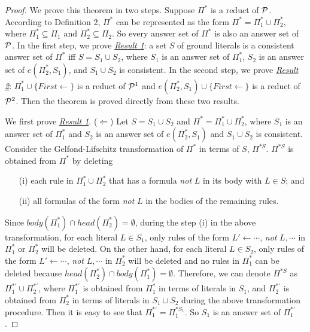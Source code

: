 \documentclass{tlp}
\begin{document}
\noindent
\begin{proof}
We prove this theorem in two steps. Suppose $\Pi^{*}$ is a reduct of ${\cal P}$.
According to Definition
2, $\Pi^{*}$ can be represented as the form
$\Pi^{*}=\Pi_{1}^{*}\cup\Pi_{2}^{*}$, where $\Pi_{1}^{*}\subseteq\Pi_{1}$ and
$\Pi_{2}^{*}\subseteq \Pi_{2}$.
So every answer set of $\Pi^{*}$ is also an answer set of ${\cal P}$.
In the first step, 
we prove \underline{\em Result 1}: a set $S$ of ground literals is a
consistent answer set of $\Pi^{*}$ iff $S=S_{1}\cup S_{2}$, where
$S_{1}$ is an answer set of $\Pi_{1}^{*}$, $S_{2}$ is an answer set of
$e(\Pi_{2}^{*},S_{1})$, and $S_{1}\cup S_{2}$ is consistent.
In the second step, we prove \underline{\em Result 2}:
$\Pi_{1}^{*}\cup\{First\leftarrow\}$ is a reduct of
${\cal P}^{1}$ and $e(\Pi_{2}^{*},S_{1})\cup\{First\leftarrow\}$ is a reduct of
${\cal P}^{2}$. Then the theorem is proved  directly from these two results.

We first prove \underline{\em Result 1}. ($\Leftarrow$)
Let $S=S_{1}\cup S_2$ and
$\Pi^{*}=\Pi_{1}^{*}\cup\Pi_{2}^{*}$, where $S_{1}$ is an answer set
of $\Pi_{1}^{*}$ and $S_2$ is an answer set of
$e(\Pi_{2}^{*},S_{1})$ and  $S_{1}\cup S_2$
is consistent. 
Consider the Gelfond-Lifschitz transformation of
$\Pi^{*}$ in terms of $S$, $\Pi^{* S}$.
$\Pi^{* S}$ is obtained from $\Pi^{*}$ by deleting
\begin{enumerate}[(ii)]
\item[(i)] each rule in
$\Pi_{1}^{*}\cup\Pi_{2}^{*}$ that has a formula {\em not} $L$ in its
body with $L\in S$; and
\item[(ii)] all formulas of the form
{\em not} $L$ in the bodies of the remaining rules.
\end{enumerate}
Since $body(\Pi_{1}^{*})\cap head(\Pi_{2}^{*})=\emptyset$, during the
step (i) in the above transformation, for each literal
$L\in S_{1}$, only rules of the
form $L'\leftarrow\cdots$, {\em not} $L, \cdots$
in $\Pi_{1}^{*}$ or $\Pi_{2}^{*}$ will be deleted.
On the other hand, for each literal $L\in S_2$,
only rules of the form $L'\leftarrow\cdots$, {\em not} $L, \cdots$ in
$\Pi_{2}^{*}$ will be deleted and no rules in $\Pi_{1}^{*}$ can be deleted
because $head(\Pi_2^{*})\cap body(\Pi_1^{*})=\emptyset$.
%     
Therefore, we can denote
$\Pi^{* S}$ as $\Pi_{1}^{*'}\cup \Pi_{2}^{*'}$, where
$\Pi_{1}^{*'}$ is obtained from $\Pi_{1}^{*}$ in terms of literals in $S_{1}$, and
$\Pi_{2}^{*'}$ is obtained from $\Pi_{2}^{*}$ in terms of literals in
$S_{1}\cup S_2$
during the above transformation procedure. Then it is easy to see
that $\Pi_{1}^{*'}=\Pi_{1}^{* S_{1}}$. So $S_{1}$ is an answer set of
$\Pi_{1}^{*'}$.


\end{proof}
\end{document}
